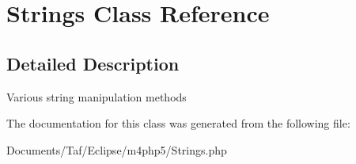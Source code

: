 \hypertarget{classStrings}{
\section{Strings Class Reference}
\label{classStrings}
}


\subsection{Detailed Description}
Various string manipulation methods 

The documentation for this class was generated from the following file:\begin{CompactItemize}
\item 
Documents/Taf/Eclipse/m4php5/Strings.php\end{CompactItemize}
